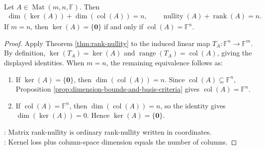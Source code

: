 \begin{corollary} \label{cor:matrix-rank-nullity} \\
Let $A\in\operatorname{Mat}(m,n,\mathbb{F})$. Then
\begin{align}
\dim(\ker(A))+\dim(\operatorname{col}(A))=n,
\qquad
\operatorname{nullity}(A)+\operatorname{rank}(A)=n. \nonumber
\end{align}
If $m=n$, then $\ker(A)=\{\mathbf{0}\}$ if and only if $\operatorname{col}(A)=\mathbb{F}^n$.
\begin{proof}
Apply Theorem \ref{thm:rank-nullity} to the induced linear map $T_A:\mathbb{F}^n\to\mathbb{F}^m$. By definition, $\ker(T_A)=\ker(A)$ and $\operatorname{range}(T_A)=\operatorname{col}(A)$, giving the displayed identities. When $m=n$, the remaining equivalence follows as:
\begin{enumerate}[label=\roman*.]
\setlength{\itemsep}{0pt}
\item[$(\Rightarrow)$] If $\ker(A)=\{\mathbf{0}\}$, then $\dim(\operatorname{col}(A))=n$. Since $\operatorname{col}(A)\subseteq\mathbb{F}^n$, Proposition \ref{prop:dimension-bounds-and-basis-criteria} gives $\operatorname{col}(A)=\mathbb{F}^n$.
\item[$(\Leftarrow)$] If $\operatorname{col}(A)=\mathbb{F}^n$, then $\dim(\operatorname{col}(A))=n$, so the identity gives $\dim(\ker(A))=0$. Hence $\ker(A)=\{\mathbf{0}\}$.
\end{enumerate}
: Matrix rank-nullity is ordinary rank-nullity written in coordinates.\\
: Kernel loss plus column-space dimension equals the number of columns.
\end{proof}
\end{corollary}

